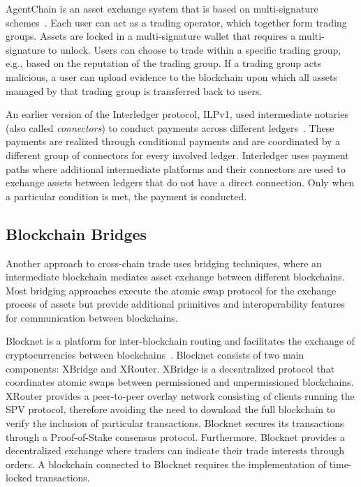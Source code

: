 AgentChain is an asset exchange system that is based on multi-signature schemes~\cite{li2019agentchain}.
Each user can act as a trading operator, which together form trading groups.
Assets are locked in a multi-signature wallet that requires a multi-signature to unlock.
Users can choose to trade within a specific trading group, e.g., based on the reputation of the trading group.
If a trading group acts malicious, a user can upload evidence to the blockchain upon which all assets managed by that trading group is transferred back to users.

An earlier version of the Interledger protocol, ILPv1, used intermediate notaries (also called \emph{connectors}) to conduct payments across different ledgers~\cite{thomas2015protocol}.
These payments are realized through conditional payments and are coordinated by a different group of connectors for every involved ledger.
Interledger uses payment paths where additional intermediate platforms and their connectors are used to exchange assets between ledgers that do not have a direct connection.
Only when a particular condition is met, the payment is conducted.


\subsection{Blockchain Bridges}
Another approach to cross-chain trade uses bridging techniques, where an intermediate blockchain mediates asset exchange between different blockchains.
Most bridging approaches execute the atomic swap protocol for the exchange process of assets but provide additional primitives and interoperability features for communication between blockchains.

Blocknet is a platform for inter-blockchain routing and facilitates the exchange of cryptocurrencies between blockchains~\cite{culwick2019blocknet}.
Blocknet consists of two main components: XBridge and XRouter.
XBridge is a decentralized protocol that coordinates atomic swaps between permissioned and unpermissioned blockchains.
XRouter provides a peer-to-peer overlay network consisting of clients running the SPV protocol, therefore avoiding the need to download the full blockchain to verify the inclusion of particular transactions.
Blocknet secures its transactions through a Proof-of-Stake consensus protocol.
Furthermore, Blocknet provides a decentralized exchange where traders can indicate their trade interests through orders.
A blockchain connected to Blocknet requires the implementation of time-locked transactions.

